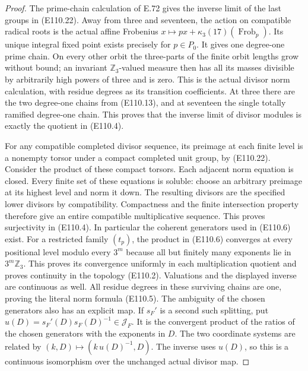 \begin{proof}
The prime-chain calculation of E.72 gives the inverse limit of
the last groups in (E110.22). Away from three and seventeen,
the action on compatible radical roots is the actual affine
Frobenius
$x\mapsto px+\kappa_3(17)(\operatorname{Frob}_p)$.
Its unique integral fixed point exists precisely for $p\in P_0$.
It gives one degree-one prime chain. On every other orbit the
three-parts of the finite orbit lengths grow without bound;
an invariant $\mathbb Z_3$-valued measure then has all its masses
divisible by arbitrarily high powers of three and is zero.
This is the actual divisor norm calculation, with residue degrees
as its transition coefficients. At three there are the two
degree-one chains from (E110.13), and at seventeen the single
totally ramified degree-one chain. This proves that the inverse
limit of divisor modules is exactly the quotient in (E110.4).

For any compatible completed divisor sequence, its preimage at
each finite level is a nonempty torsor under a compact completed
unit group, by (E110.22).
Consider the product of these compact torsors. Each adjacent norm
equation is closed. Every finite set of these equations is soluble:
choose an arbitrary preimage at its highest level and norm it
down. The resulting divisors are the specified lower divisors
by compatibility. Compactness and the finite intersection property
therefore give an entire compatible multiplicative sequence.
This proves surjectivity in (E110.4).
In particular the coherent generators used in (E110.6) exist.
For a restricted family $(t_p)$, the product in (E110.6) converges
at every positional level modulo every $3^m$ because all but
finitely many exponents lie in $3^m\mathbb Z_3$.
This proves its convergence uniformly in each multiplication
quotient and proves continuity in the topology (E110.2).
Valuations and the displayed inverse are continuous as well.
All residue degrees in these surviving chains are one, proving
the literal norm formula (E110.5).
The ambiguity of the chosen generators also has an explicit map.
If $s_F'$ is a second such splitting, put
$u(D)=s_F'(D)s_F(D)^{-1}\in\mathcal J_F$.
It is the convergent product of the ratios of the chosen
generators with the exponents in $D$. The two coordinate systems
are related by $(k,D)\mapsto(k\,u(D)^{-1},D)$.
The inverse uses $u(D)$, so this is a continuous isomorphism
over the unchanged actual divisor map.


\end{proof}
